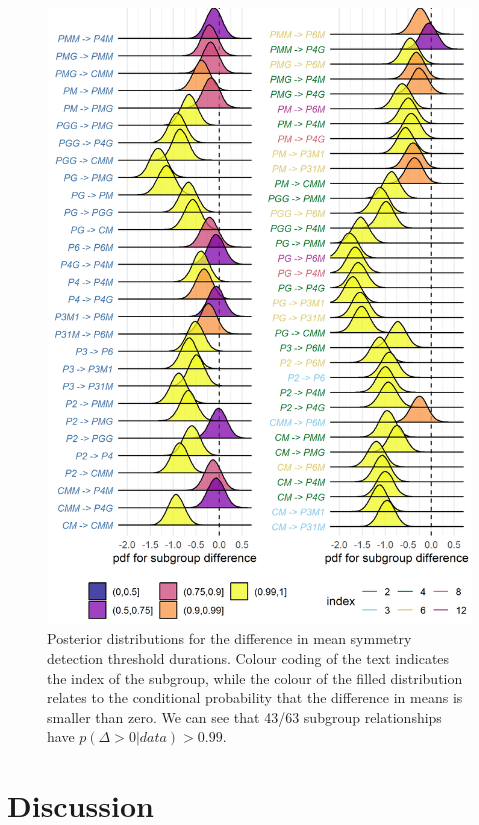 \documentclass[11pt, twoside]{article}
\begin{document}
\begin{figure}[hptb]
\centering
\includegraphics[width=0.75\linewidth]{../analysis/plots/subgroup_comp_psychophysical.png}
\caption{Posterior distributions for the difference in mean symmetry detection threshold durations. Colour coding of the text indicates the index of the subgroup, while the colour of the filled distribution relates to the conditional probability that the difference in means is smaller than zero. We can see that 43/63 subgroup relationships have $p(\Delta >0 | data)>0.99$.}
\label{fig:durations_comp}
\end{figure}

\section*{Discussion}
\end{document}

